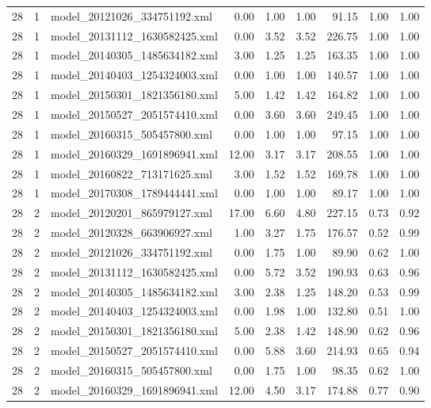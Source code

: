 \begin{table}[ht]
\begin{tabular}{rrlrrrrrr}
   28 &   1 & model\_20121026\_334751192.xml & 0.00 & 1.00 & 1.00 & 91.15 & 1.00 & 1.00 \\ 
   28 &   1 & model\_20131112\_1630582425.xml & 0.00 & 3.52 & 3.52 & 226.75 & 1.00 & 1.00 \\ 
   28 &   1 & model\_20140305\_1485634182.xml & 3.00 & 1.25 & 1.25 & 163.35 & 1.00 & 1.00 \\ 
   28 &   1 & model\_20140403\_1254324003.xml & 0.00 & 1.00 & 1.00 & 140.57 & 1.00 & 1.00 \\ 
   28 &   1 & model\_20150301\_1821356180.xml & 5.00 & 1.42 & 1.42 & 164.82 & 1.00 & 1.00 \\ 
   28 &   1 & model\_20150527\_2051574410.xml & 0.00 & 3.60 & 3.60 & 249.45 & 1.00 & 1.00 \\ 
   28 &   1 & model\_20160315\_505457800.xml & 0.00 & 1.00 & 1.00 & 97.15 & 1.00 & 1.00 \\ 
   28 &   1 & model\_20160329\_1691896941.xml & 12.00 & 3.17 & 3.17 & 208.55 & 1.00 & 1.00 \\ 
   28 &   1 & model\_20160822\_713171625.xml & 3.00 & 1.52 & 1.52 & 169.78 & 1.00 & 1.00 \\ 
   28 &   1 & model\_20170308\_1789444441.xml & 0.00 & 1.00 & 1.00 & 89.17 & 1.00 & 1.00 \\ 
   28 &   2 & model\_20120201\_865979127.xml & 17.00 & 6.60 & 4.80 & 227.15 & 0.73 & 0.92 \\ 
   28 &   2 & model\_20120328\_663906927.xml & 1.00 & 3.27 & 1.75 & 176.57 & 0.52 & 0.99 \\ 
   28 &   2 & model\_20121026\_334751192.xml & 0.00 & 1.75 & 1.00 & 89.90 & 0.62 & 1.00 \\ 
   28 &   2 & model\_20131112\_1630582425.xml & 0.00 & 5.72 & 3.52 & 190.93 & 0.63 & 0.96 \\ 
   28 &   2 & model\_20140305\_1485634182.xml & 3.00 & 2.38 & 1.25 & 148.20 & 0.53 & 0.99 \\ 
   28 &   2 & model\_20140403\_1254324003.xml & 0.00 & 1.98 & 1.00 & 132.80 & 0.51 & 1.00 \\ 
   28 &   2 & model\_20150301\_1821356180.xml & 5.00 & 2.38 & 1.42 & 148.90 & 0.62 & 0.96 \\ 
   28 &   2 & model\_20150527\_2051574410.xml & 0.00 & 5.88 & 3.60 & 214.93 & 0.65 & 0.94 \\ 
   28 &   2 & model\_20160315\_505457800.xml & 0.00 & 1.75 & 1.00 & 98.35 & 0.62 & 1.00 \\ 
   28 &   2 & model\_20160329\_1691896941.xml & 12.00 & 4.50 & 3.17 & 174.88 & 0.77 & 0.90 \\ 

\end{tabular}
\end{table}
